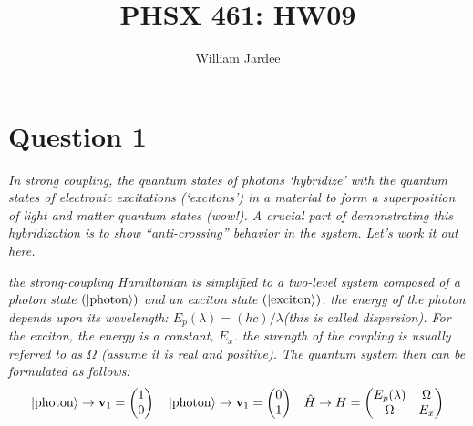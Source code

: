 \documentclass[12pt]{article}
\begin{document}
\title{PHSX 461: HW09}
\author{William Jardee}
\maketitle

\section*{Question 1}
\emph{In strong coupling, the quantum states of photons ‘hybridize’ with the quantum states of electronic excitations (‘excitons’) in a material to form a superposition of light and matter quantum states (wow!). A crucial part of demonstrating this hybridization is to show “anti-crossing” behavior in the system. Let’s work it out here.}

\emph{the strong-coupling Hamiltonian is simplified to a two-level system composed of a photon state $(\ket{\text{photon}})$ and an exciton state $(\ket{\text{exciton}})$. the energy of the photon depends upon its wavelength: $E_p(\lambda)=(h c)/\lambda$(this is called dispersion). For the exciton, the energy is a constant, $E_x$. the strength of the coupling is usually referred to as $\Omega$ (assume it is real and positive). The quantum system then can be formulated as follows:}
\[\ket{\text{photon}} \rightarrow \vb{v}_1 = \mqty(1 \\ 0) \quad \ket{\text{photon}} \rightarrow \vb{v}_1 = \mqty(0 \\ 1) \quad \hat{H} \rightarrow H = \mqty(E_p(\lambda) & \Omega \\ \Omega & E_x)\]
\end{document}
